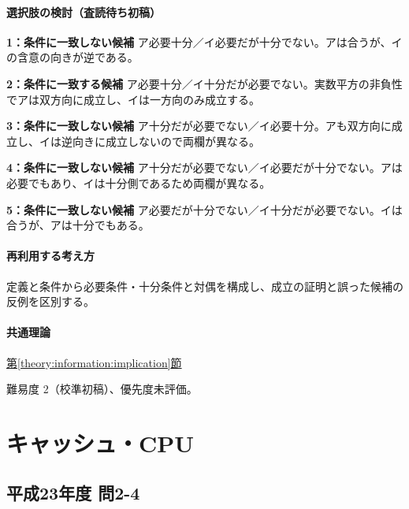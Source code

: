 \paragraph{選択肢の検討（査読待ち初稿）}\mbox{}\par

\noindent\textbf{1：条件に一致しない候補} ア必要十分／イ必要だが十分でない。アは合うが、イの含意の向きが逆である。\par

\noindent\textbf{2：条件に一致する候補} ア必要十分／イ十分だが必要でない。実数平方の非負性でアは双方向に成立し、イは一方向のみ成立する。\par

\noindent\textbf{3：条件に一致しない候補} ア十分だが必要でない／イ必要十分。アも双方向に成立し、イは逆向きに成立しないので両欄が異なる。\par

\noindent\textbf{4：条件に一致しない候補} ア十分だが必要でない／イ必要だが十分でない。アは必要でもあり、イは十分側であるため両欄が異なる。\par

\noindent\textbf{5：条件に一致しない候補} ア必要だが十分でない／イ十分だが必要でない。イは合うが、アは十分でもある。\par

\paragraph{再利用する考え方} 定義と条件から必要条件・十分条件と対偶を構成し、成立の証明と誤った候補の反例を区別する。

\paragraph{共通理論} \hyperref[theory:information:implication]{第\ref*{theory:information:implication}節}

\par 難易度 2（校準初稿）、優先度未評価。

\section{キャッシュ・CPU}

\subsection{平成23年度 問2-4}
\label{q:h23-reg-basic-2-4}

